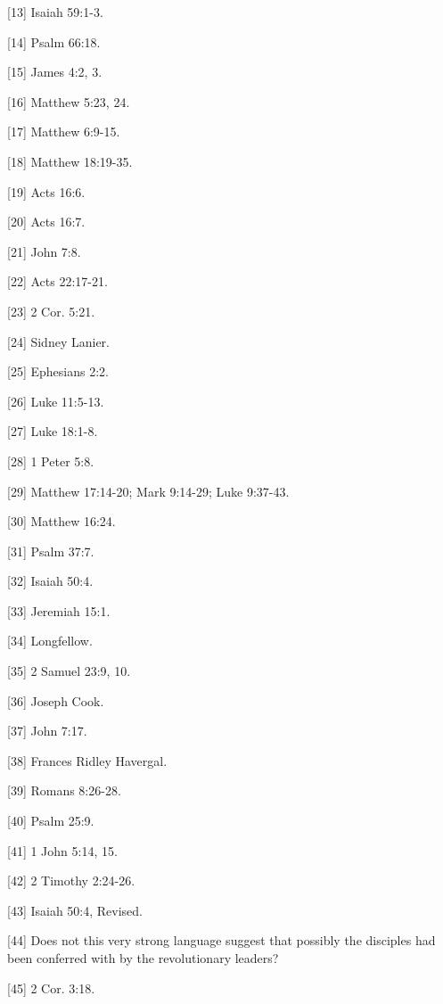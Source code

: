 [13] Isaiah 59:1-3.

[14] Psalm 66:18.

[15] James 4:2, 3.

[16] Matthew 5:23, 24.

[17] Matthew 6:9-15.

[18] Matthew 18:19-35.

[19] Acts 16:6.

[20] Acts 16:7.

[21] John 7:8.

[22] Acts 22:17-21.

[23] 2 Cor. 5:21.

[24] Sidney Lanier.

[25] Ephesians 2:2.

[26] Luke 11:5-13.

[27] Luke 18:1-8.

[28] 1 Peter 5:8.

[29] Matthew 17:14-20; Mark 9:14-29; Luke 9:37-43.

[30] Matthew 16:24.

[31] Psalm 37:7.

[32] Isaiah 50:4.

[33] Jeremiah 15:1.

[34] Longfellow.

[35] 2 Samuel 23:9, 10.

[36] Joseph Cook.

[37] John 7:17.

[38] Frances Ridley Havergal.

[39] Romans 8:26-28.

[40] Psalm 25:9.

[41] 1 John 5:14, 15.

[42] 2 Timothy 2:24-26.

[43] Isaiah 50:4, Revised.

[44] Does not this very strong language suggest that possibly the
disciples had been conferred with by the revolutionary leaders?

[45] 2 Cor. 3:18.







